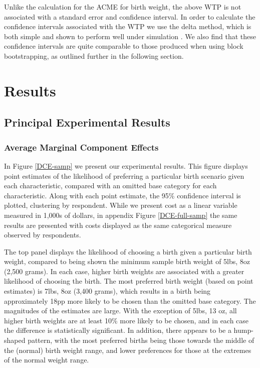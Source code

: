 \documentclass[a4paper, 11pt]{article}
\begin{document}
\begin{spacing}{1.4}
Unlike the calculation for the ACME for birth weight, the above WTP
is not associated with a standard error and confidence interval.  In
order to calculate the confidence intervals associated with the WTP
we use the delta method, which is both simple and shown to perform
well under simulation \citep{Hole2007}.  We also find that these
confidence intervals are quite comparable to those produced when using
block bootstrapping, as outlined further in the following section.

\section{Results}
\label{scn:results}
\subsection{Principal Experimental Results}
\subsubsection{Average Marginal Component Effects}
In Figure \ref{DCE-samp} we present our experimental results.  This figure
displays point estimates of the likelihood of preferring a particular
birth scenario given each characteristic, compared with an omitted base category
for each characteristic.  Along with each point estimate, the 95\%
confidence interval is plotted, clustering by respondent.  While we present cost as a linear variable measured in 1,000s of
dollars, in appendix Figure \ref{DCE-full-samp} the same results are
presented with costs displayed as the same categorical measure observed
by respondents.

The top panel displays the likelihood of choosing a birth given a
particular birth weight, compared to being shown the minimum sample
birth weight of 5lbs, 8oz (2,500 grams).  In each case, higher birth
weights are associated with a greater likelihood of choosing the
birth.  The most preferred birth weight (based on point estimates) is
7lbs, 8oz (3,400 grams), which results in a birth being approximately
18pp more likely to be chosen than the omitted base category.  The
magnitudes of the estimates are large.  With the exception of 5lbs, 13
oz, all higher birth weights are at least 10\% more likely to be chosen,
and in each case the difference is statistically significant.  In addition, there appears to be a hump-shaped pattern, with the most
preferred births being those towards the middle of the (normal) birth
weight range, and lower preferences for those at the extremes of the
normal weight range.  %


\end{spacing}
\end{document}
